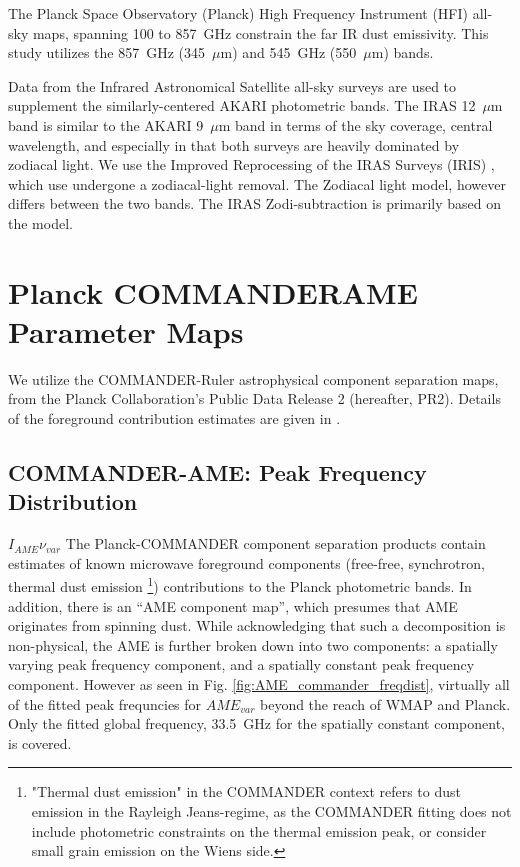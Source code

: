      The Planck Space Observatory (Planck) High Frequency Instrument (HFI) all-sky maps, spanning 100 to 857~GHz \citep{hfi14viii} constrain the far IR dust emissivity. This study utilizes the 857~GHz (345~$\mu$m) and 545~GHz (550~$\mu$m) bands.

     Data from the Infrared Astronomical Satellite \citep{iras84} all-sky surveys are used to supplement the similarly-centered AKARI photometric bands. The IRAS 12~$\mu$m band is similar to the AKARI 9~$\mu$m band in terms of the sky coverage, central wavelength, and especially in that both surveys are heavily dominated by zodiacal light. We use the Improved Reprocessing of the IRAS Surveys (IRIS) \citep{iris05}, which use undergone a zodiacal-light removal. The Zodiacal light model, however differs between the two bands. The IRAS Zodi-subtraction is primarily based on the \cite{kelsall98} model.

\section{Planck COMMANDERAME Parameter Maps}

     We utilize the COMMANDER-Ruler astrophysical component separation maps, from the Planck Collaboration's Public Data Release 2 (hereafter, PR2). Details of the foreground contribution estimates are given in \cite{planckXII}.


     \subsection{COMMANDER-AME: Peak Frequency Distribution}

      $I_{AME}\nu_{var}$
      The Planck-COMMANDER component separation products contain estimates of known microwave foreground components (free-free, synchrotron, thermal dust emission \footnote{"Thermal dust emission" in the COMMANDER context refers to dust emission in the Rayleigh Jeans-regime, as the COMMANDER fitting does not include photometric constraints on the thermal emission peak, or consider small grain emission on the Wiens side.}) contributions to the Planck photometric bands. In addition, there is an ``AME component map'', which presumes that AME originates from spinning dust. While acknowledging that such a decomposition is non-physical, the AME is further broken down into two components: a spatially varying peak frequency component, and a spatially constant peak frequency component. However as seen in Fig. \ref{fig:AME_commander_freqdist}, virtually all of the fitted peak frequncies for $AME_{var}$ beyond the reach of WMAP and Planck. Only the fitted global frequency, 33.5~GHz for the spatially constant component, is covered.


